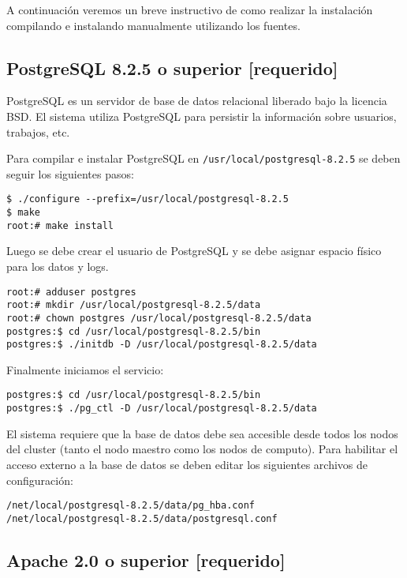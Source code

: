 \documentclass[a4paper,10pt,spanish]{article}
\begin{document}
A continuaci\'{o}n veremos un breve instructivo de como realizar la instalaci\'{o}n compilando e instalando manualmente utilizando los fuentes.

\subsection{PostgreSQL 8.2.5 o superior \small{[requerido]}}

PostgreSQL\cite{postgres} es un servidor de base de datos relacional liberado bajo la licencia BSD. El sistema utiliza PostgreSQL para persistir la informaci\'{o}n sobre usuarios, trabajos, etc.

Para compilar e instalar PostgreSQL en \mbox{\texttt{/usr/local/postgresql-8.2.5}} se deben seguir los siguientes pasos:

\begin{verbatim}
$ ./configure --prefix=/usr/local/postgresql-8.2.5
$ make
root:# make install
\end{verbatim}

Luego se debe crear el usuario de PostgreSQL y se debe asignar espacio f\'{i}sico para los datos y logs.

\begin{verbatim}
root:# adduser postgres 
root:# mkdir /usr/local/postgresql-8.2.5/data 
root:# chown postgres /usr/local/postgresql-8.2.5/data 
postgres:$ cd /usr/local/postgresql-8.2.5/bin
postgres:$ ./initdb -D /usr/local/postgresql-8.2.5/data 
\end{verbatim}

Finalmente iniciamos el servicio:

\begin{verbatim}
postgres:$ cd /usr/local/postgresql-8.2.5/bin
postgres:$ ./pg_ctl -D /usr/local/postgresql-8.2.5/data
\end{verbatim}

El sistema requiere que la base de datos debe sea accesible desde todos los nodos del cluster (tanto el nodo maestro como los nodos de computo). Para habilitar el acceso externo a la base de datos se deben editar los siguientes archivos de configuraci\'{o}n:
\begin{verbatim}
/net/local/postgresql-8.2.5/data/pg_hba.conf
/net/local/postgresql-8.2.5/data/postgresql.conf
\end{verbatim}

\subsection{Apache 2.0 o superior \small{[requerido]}}
\end{document}
